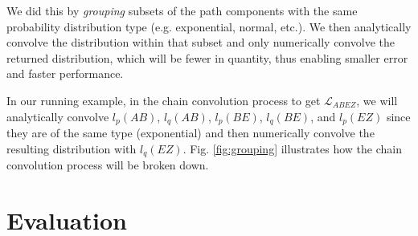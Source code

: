\documentclass[10pt,sigconf,letterpaper,anonymous,nonacm]{acmart}
\begin{document}
We did this by \textit{grouping} subsets of the path components with the same probability distribution 
type (e.g. exponential, normal, etc.). 
We then analytically convolve the distribution within that subset and only numerically convolve the 
returned distribution, which will be fewer in quantity, thus enabling smaller error and faster performance.

In our running example, in the chain convolution process to get $\mathcal{L}_{ABEZ}$, we will analytically
convolve $l_p(AB)$, $l_q(AB)$, $l_p(BE)$, $l_q(BE)$, and $l_p(EZ)$ since they are of the same type (exponential) 
and then numerically convolve the resulting distribution with $l_q(EZ)$.
Fig. \ref{fig:grouping} illustrates how the chain convolution process will be broken down.





\section{Evaluation}
\end{document}
